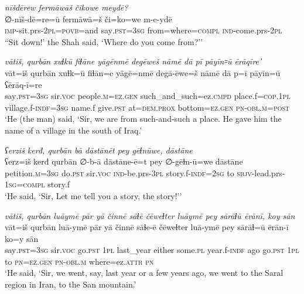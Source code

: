 \ea \label{ZQ.4}
\textit{nīšdērew fermāwāš čikowe meydē?} \\ 
\gll ∅-nīš-dē=re=ū fermāwā=š či=ko=we m-e-ydē \\ 
 \textsc{imp-}sit.prs-\textsc{2pl}\textsc{=\textsc{povb}}=and say\textsc{.pst}\textsc{=3sg} from=where\textsc{=compl} \textsc{ind-}come.prs-\textsc{2pl} \\ 
\glt ``Sit down!' the Shah said, ‘Where do you come from?’'
\z 
 
\ea \label{ZQ.5}
\textit{vātiš, qurbān xuɫkū fiɫāne yāgēnmē degēweš nāmē dā pī pāyīn꞊ū ērāqīre'} \\ 
\gll vāt=iš qurbān xuɫk=ū fiɫān=e yāgē=nmē degā-ēwe=š nāmē dā p=ī pāyīn=ū ʕērāq-ī=re \\ 
 say\textsc{.pst}\textsc{=3sg} sir.\textsc{voc} people\textsc{.m}\textsc{=ez.gen} such\_and\_such=ez\textsc{.cmpd} place.f\textsc{=cop}\textsc{.\textsc{1pl}} village.f\textsc{-indf}\textsc{=3sg} name.f give\textsc{.pst} at=\textsc{dem.prox} bottom\textsc{=ez.gen} \textsc{pn}\textsc{-obl}\textsc{.m}\textsc{=\textsc{post}} \\ 
\glt `He (the man) said, ‘Sir, we are from such-and-such a place. He gave him the name of a village in the south of Iraq.'
\z 
 
\ea \label{ZQ.7}
\textit{ʕerziš kerđ, qurbān bā dāstānēt pey gēɫnūwe, dāstāne} \\ 
\gll ʕerz=iš kerđ qurbān ∅-b-ā dāstāne-ē=t pey ∅-gēɫn-ū=we dāstāne \\ 
 petition\textsc{.m}\textsc{=3sg} do\textsc{.pst} sir.\textsc{voc} \textsc{ind-}be.prs\textsc{-3pl} story.f\textsc{-indf}\textsc{=\textsc{2sg}} to \textsc{sbjv-}lead.prs\textsc{-\textsc{1sg}}\textsc{=compl} story.f \\ 
\glt `He said, ‘Sir, Let me tell you a story, the story!’'
\z 
 
\ea \label{ZQ.9}
\textit{vātiš, qurbān luāymē pār yā činnē sāɫē čēweɫter luāymē pey sārāɫū ērānī, koy sān} \\ 
\gll vāt=iš qurbān luā-ymē pār yā činnē sāɫe-ē čēweɫter luā-ymē pey sārāɫ=ū ērān-ī ko=y sān \\ 
 say\textsc{.pst}\textsc{=3sg} sir.\textsc{voc} go\textsc{.pst} \textsc{1pl} last\_year either some\textsc{.pl} year.f\textsc{-indf} ago go\textsc{.pst} \textsc{1pl} to \textsc{pn}\textsc{=ez.gen} \textsc{pn}\textsc{-obl}\textsc{.m} where=ez.\textsc{attr} \textsc{pn} \\ 
\glt `He said, ‘Sir, we went, say, last year or a few years ago, we went to the Saral region in Iran, to the San mountain.'
\z 
 

